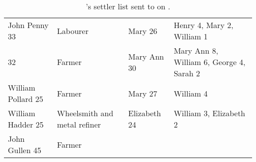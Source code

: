 \begin{table}[!ht]
\begin{tabular}{@{}p{3cm}p{1.5cm}p{2cm}p{5cm}@{}}
    John Penny 33               & Labourer                     & Mary 26               & Henry 4, Mary 2, William 1                                                                                                                    \\
    \pollardGName{} 32          & Farmer                       & Mary Ann 30           & Mary Ann 8, William 6, George 4, Sarah 2                                                                                                      \\
    William Pollard 25          & Farmer                       & Mary 27               & William 4                                                                                                                                     \\
    William Hadder 25           & Wheelsmith and metal refiner & Elizabeth 24          & William 3, Elizabeth 2                                                                                                                        \\
    John Gullen 45              & Farmer                       &                       &                                                                                                                                               \\
    \bottomrule
  \end{tabular}

  \caption{\biggarASurname{}'s settler list sent to \bathurstHName{} on .}
  \label{table:biggarlist}
\end{table}

